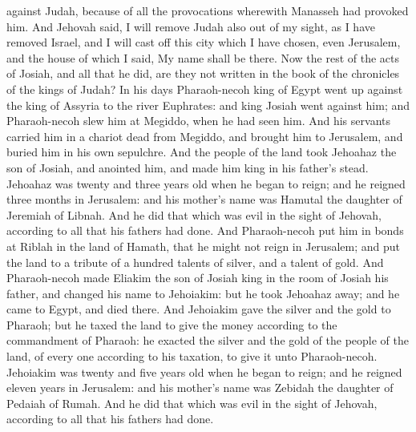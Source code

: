 against Judah, because of all the provocations wherewith Manasseh had provoked him. And Jehovah said, I will remove Judah also out of my sight, as I have removed Israel, and I will cast off this city which I have chosen, even Jerusalem, and the house of which I said, My name shall be there.  Now the rest of the acts of Josiah, and all that he did, are they not written in the book of the chronicles of the kings of Judah? In his days Pharaoh-necoh king of Egypt went up against the king of Assyria to the river Euphrates: and king Josiah went against him; and Pharaoh-necoh slew him at Megiddo, when he had seen him. And his servants carried him in a chariot dead from Megiddo, and brought him to Jerusalem, and buried him in his own sepulchre. And the people of the land took Jehoahaz the son of Josiah, and anointed him, and made him king in his father’s stead.  Jehoahaz was twenty and three years old when he began to reign; and he reigned three months in Jerusalem: and his mother’s name was Hamutal the daughter of Jeremiah of Libnah. And he did that which was evil in the sight of Jehovah, according to all that his fathers had done. And Pharaoh-necoh put him in bonds at Riblah in the land of Hamath, that he might not reign in Jerusalem; and put the land to a tribute of a hundred talents of silver, and a talent of gold. And Pharaoh-necoh made Eliakim the son of Josiah king in the room of Josiah his father, and changed his name to Jehoiakim: but he took Jehoahaz away; and he came to Egypt, and died there. And Jehoiakim gave the silver and the gold to Pharaoh; but he taxed the land to give the money according to the commandment of Pharaoh: he exacted the silver and the gold of the people of the land, of every one according to his taxation, to give it unto Pharaoh-necoh.  Jehoiakim was twenty and five years old when he began to reign; and he reigned eleven years in Jerusalem: and his mother’s name was Zebidah the daughter of Pedaiah of Rumah. And he did that which was evil in the sight of Jehovah, according to all that his fathers had done. 

